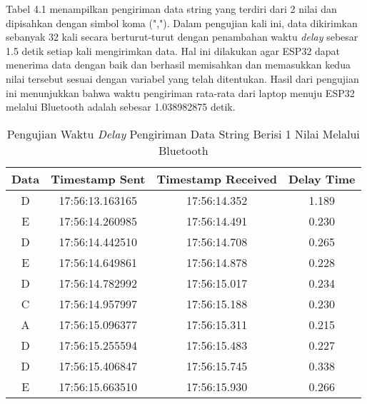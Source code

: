 Tabel 4.1 menampilkan pengiriman data string yang terdiri dari 2 nilai dan dipisahkan dengan simbol koma (","). Dalam pengujian kali ini, data dikirimkan sebanyak 32 kali secara berturut-turut dengan penambahan waktu \emph{delay} sebesar 1.5 detik setiap kali mengirimkan data. Hal ini dilakukan agar ESP32 dapat menerima data dengan baik dan berhasil memisahkan dan memasukkan kedua nilai tersebut sesuai dengan variabel yang telah ditentukan. Hasil dari pengujian ini menunjukkan bahwa waktu pengiriman rata-rata dari laptop menuju ESP32 melalui Bluetooth adalah sebesar 1.038982875 detik.

\begin{longtable}{|ccc|c|}
  \caption{Pengujian Waktu \emph{Delay} Pengiriman Data String Berisi 1 Nilai Melalui Bluetooth}
  \label{tbl:delayBluetooth1}\\
  \hline
  \multicolumn{1}{|c|}{Data} & \multicolumn{1}{c|}{Timestamp Sent}  & Timestamp Received & Delay Time   \\ \hline
  \endfirsthead
  \endhead
  \multicolumn{1}{|c|}{D}    & \multicolumn{1}{c|}{17:56:13.163165} & 17:56:14.352       & 1.189        \\ \hline
  \multicolumn{1}{|c|}{E}    & \multicolumn{1}{c|}{17:56:14.260985} & 17:56:14.491       & 0.230        \\ \hline
  \multicolumn{1}{|c|}{D}    & \multicolumn{1}{c|}{17:56:14.442510} & 17:56:14.708       & 0.265        \\ \hline
  \multicolumn{1}{|c|}{E}    & \multicolumn{1}{c|}{17:56:14.649861} & 17:56:14.878       & 0.228        \\ \hline
  \multicolumn{1}{|c|}{D}    & \multicolumn{1}{c|}{17:56:14.782992} & 17:56:15.017       & 0.234        \\ \hline
  \multicolumn{1}{|c|}{C}    & \multicolumn{1}{c|}{17:56:14.957997} & 17:56:15.188       & 0.230        \\ \hline
  \multicolumn{1}{|c|}{A}    & \multicolumn{1}{c|}{17:56:15.096377} & 17:56:15.311       & 0.215        \\ \hline
  \multicolumn{1}{|c|}{D}    & \multicolumn{1}{c|}{17:56:15.255594} & 17:56:15.483       & 0.227        \\ \hline
  \multicolumn{1}{|c|}{D}    & \multicolumn{1}{c|}{17:56:15.406847} & 17:56:15.745       & 0.338        \\ \hline
  \multicolumn{1}{|c|}{E}    & \multicolumn{1}{c|}{17:56:15.663510} & 17:56:15.930       & 0.266        \\ \hline

\end{longtable}
